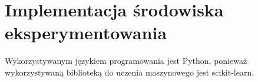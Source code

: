 \section{Implementacja środowiska eksperymentowania}
Wykorzystywanym językiem programowania jest Python, ponieważ wykorzystywaną biblioteką do uczenia maszynowego jest scikit-learn\cite{scikit}.